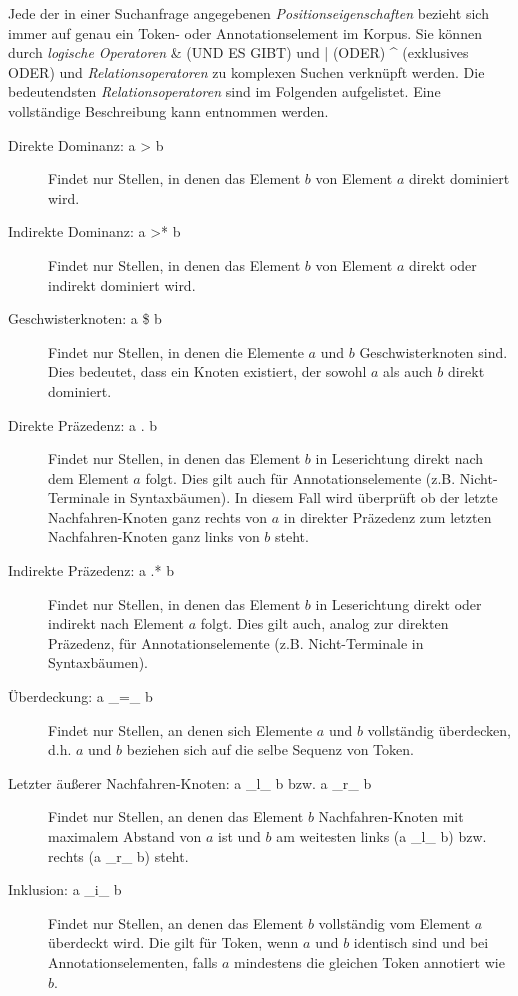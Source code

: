 \newpage
Jede der in einer Suchanfrage angegebenen \emph{Positionseigenschaften} bezieht sich immer auf genau ein Token- oder Annotationselement im Korpus. Sie können durch \emph{logische Operatoren} \& (UND ES GIBT) und | (ODER) \^{} (exklusives ODER) und \emph{Relationsoperatoren} zu komplexen Suchen verknüpft werden. Die bedeutendsten \emph{Relationsoperatoren} sind im Folgenden aufgelistet. Eine vollständige Beschreibung kann \cite{rosenfeldXXXX} entnommen werden.

\begin{description}
	\item[Direkte Dominanz: a > b]{Findet nur Stellen, in denen das Element $b$ von Element $a$ direkt dominiert wird.}
	\item[Indirekte Dominanz: a >* b]{Findet nur Stellen, in denen das Element $b$ von Element $a$ direkt oder indirekt dominiert wird.}
	\item[Geschwisterknoten: a \$ b]{Findet nur Stellen, in denen die Elemente $a$ und $b$ Geschwisterknoten sind. Dies bedeutet, dass ein Knoten existiert, der sowohl $a$ als auch $b$ direkt dominiert.}
	\item[Direkte Präzedenz: a . b]{Findet nur Stellen, in denen das Element $b$ in Leserichtung direkt nach dem Element $a$ folgt. Dies gilt auch für Annotationselemente (z.B. Nicht-Terminale in Syntaxbäumen). In diesem Fall wird überprüft ob der letzte Nachfahren-Knoten ganz rechts von $a$ in direkter Präzedenz zum letzten Nachfahren-Knoten ganz links von $b$ steht.
}	\item[Indirekte Präzedenz: a .* b]{Findet nur Stellen, in denen das Element $b$ in Leserichtung direkt oder indirekt nach Element $a$ folgt. Dies gilt auch, analog zur direkten Präzedenz, für Annotationselemente (z.B. Nicht-Terminale in Syntaxbäumen).}
	\item[Überdeckung: a \_=\_ b]{Findet nur Stellen, an denen sich Elemente $a$ und $b$ vollständig überdecken, d.h. $a$ und $b$ beziehen sich auf die selbe Sequenz von Token.}
	\item[Letzter äußerer Nachfahren-Knoten: a \_l\_ b bzw. a \_r\_ b]{Findet nur Stellen, an denen das Element $b$ Nachfahren-Knoten mit maximalem Abstand von $a$ ist und $b$ am weitesten links (a \_l\_ b) bzw. rechts (a \_r\_ b) steht.}
	
	\newpage
	\item[Inklusion: a \_i\_ b]{Findet nur Stellen, an denen das Element $b$ vollständig vom Element $a$ überdeckt wird. Die gilt für Token, wenn $a$ und $b$ identisch sind und bei Annotationselementen, falls $a$ mindestens die gleichen Token annotiert wie $b$.}
\end{description}

